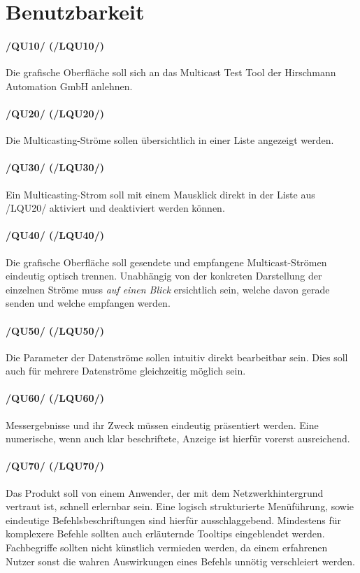\section{Benutzbarkeit}

\paragraph{/QU10/ (/LQU10/)} Die grafische Oberfläche soll sich an das
Multicast Test Tool der Hirschmann Automation GmbH anlehnen.

\paragraph{/QU20/ (/LQU20/)} Die Multicasting-Ströme sollen übersichtlich in
einer Liste angezeigt werden.

\paragraph{/QU30/ (/LQU30/)} Ein Multicasting-Strom soll mit einem Mausklick
direkt in der Liste aus /LQU20/ aktiviert und deaktiviert werden können.

\paragraph{/QU40/ (/LQU40/)} Die grafische Oberfläche soll gesendete
und empfangene Multicast-Strömen eindeutig optisch trennen. Unabhängig von der
konkreten Darstellung der einzelnen Ströme muss \emph{auf einen Blick}
ersichtlich sein, welche davon gerade senden und welche empfangen werden.

\paragraph{/QU50/ (/LQU50/)} Die Parameter der Datenströme sollen intuitiv
direkt bearbeitbar sein. Dies soll auch für mehrere Datenströme gleichzeitig möglich
sein.

\paragraph{/QU60/ (/LQU60/)} Messergebnisse und ihr Zweck müssen eindeutig
präsentiert werden. Eine numerische, wenn auch klar beschriftete, Anzeige ist hierfür
vorerst ausreichend.

\paragraph{/QU70/ (/LQU70/)} Das Produkt soll von einem Anwender, der mit dem
Netzwerkhintergrund vertraut ist, schnell erlernbar sein. Eine logisch
strukturierte Menüführung, sowie eindeutige Befehlsbeschriftungen sind hierfür
ausschlaggebend. Mindestens für komplexere Befehle sollten auch erläuternde
Tooltips eingeblendet werden. Fachbegriffe sollten nicht künstlich vermieden
werden, da einem erfahrenen Nutzer sonst die wahren Auswirkungen eines Befehls
unnötig verschleiert werden.

